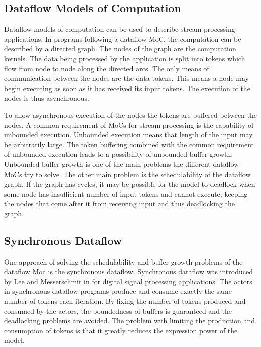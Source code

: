 \subsection{Dataflow Models of Computation}
\label{subsec:dataflow-moc}
Dataflow models of computation can be used to describe stream processing applications. In programs following a dataflow MoC, the computation can be described by a directed graph. The nodes of the graph are the computation kernels. The data being processed by the application is split into tokens which flow from node to node along the directed arcs. The only means of communication between the nodes are the data tokens. This means a node may begin executing as soon as it has received its input tokens. The execution of the nodes is thus asynchronous.~\cite{lee2015introduction}

To allow asynchronous execution of the nodes the tokens are buffered between the nodes. A common requirement of MoCs for stream processing is the capability of unbounded execution. Unbounded execution means that length of the input may be arbitrarily large. The token buffering combined with the common requirement of unbounded execution leads to a possibility of unbounded buffer growth. Unbounded buffer growth is one of the main problems the different dataflow MoCs try to solve. The other main problem is the schedulability of the dataflow graph. If the graph has cycles, it may be possible for the model to deadlock when some node has insufficient number of input tokens and cannot execute, keeping the nodes that come after it from receiving input and thus deadlocking the graph.~\cite{lee2015introduction}

\subsection{Synchronous Dataflow}
\label{subsec:synchronous-dataflow}
One approach of solving the schedulability and buffer growth problems of the dataflow Moc is the synchronous dataflow. Synchronous dataflow was introduced by Lee and Messerschmit in \cite{lee1987synchronous} for digital signal processing applications. The actors in synchronous dataflow programs produce and consume exactly the same number of tokens each iteration. By fixing the number of tokens produced and consumed by the actors, the boundedness of buffers is guaranteed and the deadlocking problems are avoided. The problem with limiting the production and consumption of tokens is that it greatly reduces the expression power of the model.~\cite{lee2015introduction}

